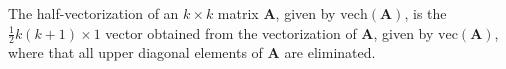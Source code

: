 The half-vectorization of an
$
k \times k
$
matrix
$
\mathbf{A}
$,
given by
$
\mathrm{vech}
\left(
\mathbf{A}
\right)
$,
is the
$
\frac{1}{2}
k
\left( 
k 
+ 
1 
\right)
\times
1
$
vector obtained from
the vectorization of 
$
\mathbf{A}
$,
given by
$
\mathrm{vec}
\left(
\mathbf{A}
\right)
$,
where that all upper diagonal elements of
$
\mathbf{A}
$
are eliminated.
